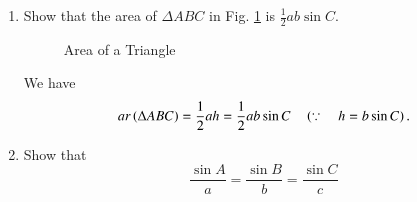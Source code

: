 \begin{enumerate}[label=\thesubsection.\arabic*.,ref=\thesubsection.\theenumi]
\item
\label{prob:tri_area_sin}
	Show that the area of $\Delta ABC$ in Fig. 	\ref{fig:tri_sss}	is $\frac{1}{2}ab \sin C$.
\begin{figure}[!ht]
	\begin{center}
			\resizebox{0.6\columnwidth}{!}{}
	\end{center}
	\caption{Area of a Triangle}
	\label{fig:tri_sss}	
\end{figure}

\solution We have
%
\begin{equation}
ar\left(\Delta ABC\right) = \frac{1}{2}ah = \frac{1}{2}ab\sin C \quad \left(\because \quad h = b \sin C\right).
\label{eq:tri_area_sin}
\end{equation}

\item
	Show that 
	\begin{equation}
	\frac{\sin A}{a} = \frac{\sin B}{b} = \frac{\sin C}{c}
	\end{equation}


\end{enumerate}
